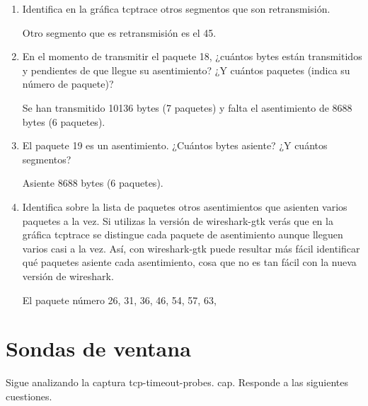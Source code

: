 \documentclass[12pt, a4paper]{report}
\begin{document}
\begin{enumerate}
	\item Identifica en la gráfica tcptrace otros segmentos que son retransmisión.
	
	Otro segmento que es retransmisión es el 45.
	
	\item En el momento de transmitir el paquete 18, ¿cuántos bytes están transmitidos y pendientes de que llegue su asentimiento? ¿Y cuántos paquetes (indica su número de paquete)?
	
	Se han transmitido 10136 bytes (7 paquetes) y falta el asentimiento de 8688 bytes (6 paquetes).
	
	\item El paquete 19 es un asentimiento. ¿Cuántos bytes asiente? ¿Y cuántos segmentos?
	
	Asiente 8688 bytes (6 paquetes).
	
	\item Identifica sobre la lista de paquetes otros asentimientos que asienten varios paquetes a la vez. Si utilizas la versión de wireshark-gtk verás que en la gráfica tcptrace se distingue cada paquete de asentimiento aunque lleguen varios casi a la vez. Así, con wireshark-gtk puede resultar más fácil identificar qué paquetes asiente cada asentimiento, cosa que no es tan fácil con la nueva versión de wireshark.
	
	El paquete número 26, 31, 36, 46, 54, 57, 63,
	
\end{enumerate}

\section{Sondas de ventana}
Sigue analizando la captura tcp-timeout-probes. cap. Responde a las siguientes cuestiones.
\end{document}
